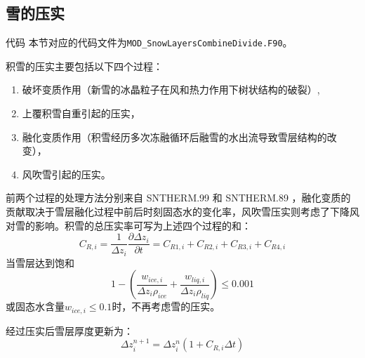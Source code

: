 \subsection{雪的压实}
\begin{mymdframed}{代码}
本节对应的代码文件为\texttt{MOD\_SnowLayersCombineDivide.F90}。
\end{mymdframed}

积雪的压实主要包括以下四个过程：
\begin{enumerate}
\item 破坏变质作用（新雪的冰晶粒子在风和热力作用下树状结构的破裂）,
\item 上覆积雪自重引起的压实，
\item 融化变质作用（积雪经历多次冻融循环后融雪的水出流导致雪层结构的改变），
\item 风吹雪引起的压实。
\end{enumerate}

前两个过程的处理方法分别来自 SNTHERM.99 \citep{jordan1999heat}和 SNTHERM.89 \citep{jordan1991one}，融化变质的贡献取决于雪层融化过程中前后时刻固态水的变化率，风吹雪压实则考虑了下降风对雪的影响。积雪的总压实率可写为上述四个过程的和：
%
\begin{equation}
C_{R,i}=\frac{1}{\Delta {z_i}} \frac{\partial \Delta {z_i}}{\partial {t}}=C_{R1,i}+C_{R2,i}+C_{R3,i}+C_{R4,i}
\end{equation}
当雪层达到饱和
\begin{equation}
1-\left(\frac{w_{ice,i}}{ \Delta {z_i} \rho_{ice}}+\frac{w_{liq,i}}{ \Delta {z_i} \rho_{liq}}\right) \leqslant 0.001
\end{equation}
或固态水含量$w_{ice,i}\leqslant0.1$时，不再考虑雪的压实。

经过压实后雪层厚度更新为：
\begin{equation}
\Delta z_i^{n+1}=\Delta z_i^n\left(1+C_{R, i} \Delta t\right)
\end{equation}


